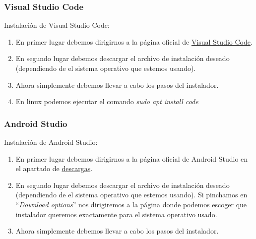 \subsubsection{Visual Studio Code}

Instalación de Visual Studio Code:

\begin{enumerate}
\item
	En primer lugar debemos dirigirnos a la página oficial de \href{https://code.visualstudio.com/}{Visual Studio Code}.
\item
	En segundo lugar debemos descargar el archivo de instalación deseado (dependiendo de el sistema operativo que estemos usando).
\item 
	Ahora simplemente debemos llevar a cabo los pasos del instalador.

\item
	En linux podemos ejecutar el comando \textit{sudo apt install code} \cite{vscforrasp}
\end{enumerate}

\subsubsection{Android Studio}

Instalación de Android Studio:

\begin{enumerate}
\item
	En primer lugar debemos dirigirnos a la página oficial de Android Studio en el apartado de \href{https://developer.android.com/studio?hl=es}{descargas}.
\item
	En segundo lugar debemos descargar el archivo de instalación deseado (dependiendo de el sistema operativo que estemos usando).
	Si pinchamos en ``\textit{Download options}'' nos dirigiremos a la página donde podemos escoger que instalador queremos exactamente para el sistema operativo usado.
\item 
	Ahora simplemente debemos llevar a cabo los pasos del instalador.
\end{enumerate}

